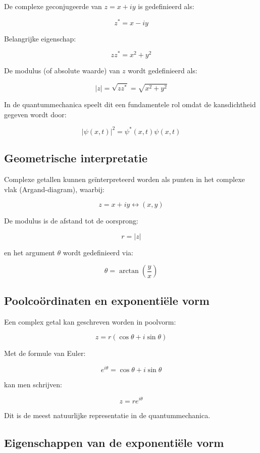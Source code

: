 \documentclass{report} %
\begin{document}
    De complexe geconjugeerde van $z = x + iy$ is gedefinieerd als:

    \[
        z^* = x - iy
    \]

    Belangrijke eigenschap:

    \[
        z z^* = x^2 + y^2
    \]

    De modulus (of absolute waarde) van $z$ wordt gedefinieerd als:

    \[
        |z| = \sqrt{z z^*} = \sqrt{x^2 + y^2}
    \]

    In de quantummechanica speelt dit een fundamentele rol omdat de kansdichtheid gegeven wordt door:

    \[
        |\psi(x,t)|^2 = \psi^*(x,t)\psi(x,t)
    \]

    \subsection{Geometrische interpretatie}

    Complexe getallen kunnen geïnterpreteerd worden als punten in het complexe vlak (Argand-diagram), waarbij:

    \[
        z = x + iy \leftrightarrow (x,y)
    \]

    De modulus is de afstand tot de oorsprong:

    \[
        r = |z|
    \]

    en het argument $\theta$ wordt gedefinieerd via:

    \[
        \theta = \arctan\left(\frac{y}{x}\right)
    \]

    \subsection{Poolcoördinaten en exponentiële vorm}

    Een complex getal kan geschreven worden in poolvorm:

    \[
        z = r(\cos\theta + i\sin\theta)
    \]

    Met de formule van Euler:

    \[
        e^{i\theta} = \cos\theta + i\sin\theta
    \]

    kan men schrijven:

    \[
        z = r e^{i\theta}
    \]

    Dit is de meest natuurlijke representatie in de quantummechanica.

    \subsection{Eigenschappen van de exponentiële vorm}
\end{document}
